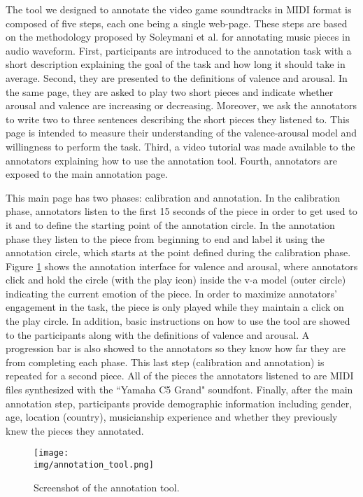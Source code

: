 The tool we designed to annotate the video game soundtracks in MIDI format
is composed of five steps, each one being a single web-page.
These steps are
based on the methodology proposed by Soleymani et al. \cite{Soleymani_2013} for annotating
music pieces in audio waveform. First, participants are introduced to the annotation
task with a short description explaining the goal of the task and how long it
should take in average. Second, they are presented to the definitions of valence and
arousal. In the same page, they are asked to play two short pieces and indicate
whether arousal and valence are increasing or decreasing. Moreover, we ask the
annotators to write two to three sentences describing the short pieces they
listened to. This page is intended to measure their understanding of the valence-arousal model
and willingness to perform the task.  Third, a video tutorial was
made available to the annotators explaining how to use the
annotation tool. Fourth, annotators are exposed to the main
annotation page.

This main page has two phases: calibration and annotation.
In the calibration phase, annotators listen to the first 15 seconds of the
piece in order to get used to it and to define the starting
point of the annotation circle. In the annotation phase they
listen to the piece from beginning to end and label it using the annotation circle, which
starts at the point defined during the calibration phase.
Figure \ref{fig:annotation_main} shows the annotation interface
for valence and arousal, where annotators click and hold the circle (with the play icon)
inside the v-a model (outer circle) indicating the current emotion
of the piece. In order to maximize annotators’ engagement in the task, the piece
is only played while they maintain a click on the play circle.
In addition, basic instructions on how to use the tool are showed to the participants
along with the definitions of valence and arousal. A progression bar is also
showed to the annotators so they know how far they are from completing each phase.
This last step (calibration and annotation) is repeated for a second piece.
All of the pieces the annotators listened to are MIDI files synthesized with the
``Yamaha C5 Grand" soundfont. Finally, after the main annotation step, participants
provide demographic information including gender, age, location (country), musicianship
experience and whether they previously knew the pieces they annotated.

\begin{figure}
 \centering
 \texttt{[image: \\img/annotation\_tool.png]}
 \caption{Screenshot of the annotation tool.}
 \label{fig:annotation_main}
\end{figure}


